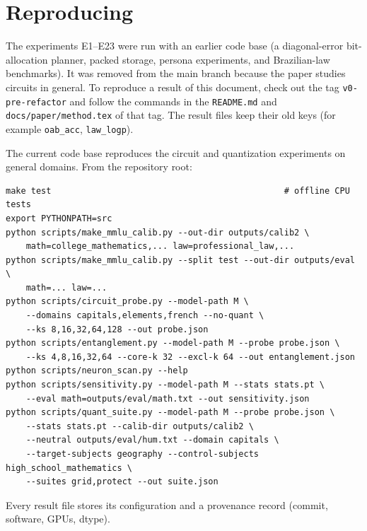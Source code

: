\documentclass[11pt]{article}
\newcommand{\code}[1]{\texttt{#1}}
\begin{document}
\section{Reproducing}
\label{sec:repro}
The experiments E1--E23 were run with an earlier code base (a diagonal-error bit-allocation planner, packed storage, persona
experiments, and Brazilian-law benchmarks). It was removed from the main branch because the paper studies circuits in general.
To reproduce a result of this document, check out the tag \code{v0-pre-refactor} and follow the commands in the \code{README.md} and
\code{docs/paper/method.tex} of that tag. The result files keep their old keys (for example \code{oab\_acc}, \code{law\_logp}).

The current code base reproduces the circuit and quantization experiments on general domains. From the repository root:
\begin{small}\begin{verbatim}
make test                                              # offline CPU tests
export PYTHONPATH=src
python scripts/make_mmlu_calib.py --out-dir outputs/calib2 \
    math=college_mathematics,... law=professional_law,...
python scripts/make_mmlu_calib.py --split test --out-dir outputs/eval \
    math=... law=...
python scripts/circuit_probe.py --model-path M \
    --domains capitals,elements,french --no-quant \
    --ks 8,16,32,64,128 --out probe.json
python scripts/entanglement.py --model-path M --probe probe.json \
    --ks 4,8,16,32,64 --core-k 32 --excl-k 64 --out entanglement.json
python scripts/neuron_scan.py --help
python scripts/sensitivity.py --model-path M --stats stats.pt \
    --eval math=outputs/eval/math.txt --out sensitivity.json
python scripts/quant_suite.py --model-path M --probe probe.json \
    --stats stats.pt --calib-dir outputs/calib2 \
    --neutral outputs/eval/hum.txt --domain capitals \
    --target-subjects geography --control-subjects high_school_mathematics \
    --suites grid,protect --out suite.json
\end{verbatim}\end{small}
Every result file stores its configuration and a provenance record (commit, software, GPUs, dtype).

\clearpage
\appendix
\end{document}
